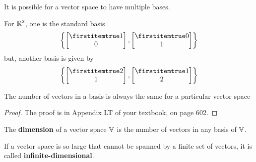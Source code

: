 \documentclass{beamer}
\begin{document}
\begin{frame}
\begin{example}
It is possible for a vector space to have multiple bases.\pause

For $\mathbb{R}^2$, one is the standard basis
\begin{equation*}
\left\{\bvector{1,0},\bvector{0,1}\right\}
\end{equation*}\pause
but, another basis is given by
\begin{equation*}
\left\{\bvector{2,1},\bvector{1,2}\right\}
\end{equation*}
\end{example}
\end{frame}

\begin{frame}
\begin{theorem}
The number of vectors in a basis is always the same for a particular vector space
\end{theorem}\pause
\begin{proof}
The proof is in Appendix LT of your textbook, on page 602.
\end{proof}\pause
\begin{definition}
The \textbf{dimension} of a vector space $\mathbb{V}$ is the number of vectors in any basis of $\mathbb{V}$.
\end{definition}\pause

\begin{definition}
If a vector space is so large that cannot be spanned by a finite set of vectors, it is called \textbf{infinite-dimensional}.
\end{definition}
\end{frame}
\end{document}
